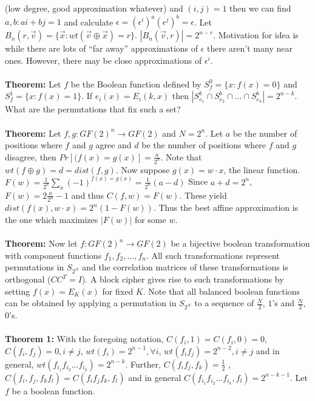 (low degree, good approximation whatever)
and $(i,j)=1$ then we can find $a, b: ai+bj=1$ and calculate
$\epsilon= (\epsilon^i)^a (\epsilon^j)^b= \epsilon$.  Let $B_n(r,{\vec v})=
\{ {\vec x} :  wt({\vec v} \oplus {\vec x}) =r \}$. $|B_n({\vec v}, r)|= 2^{n-r}$.  
Motivation for idea is while
there are lots of ``far away'' approximations of $\epsilon$ there aren't many near ones.  
However,
there may be close approximations of $\epsilon^i$.
\\
\\
{\bf Theorem:}
Let $f$ be the Boolean function defined by
$S^0_f= \{x: f(x)=0 \}$ and
$S^1_f= \{x: f(x)=1 \}$.  
If $e_i(x)= E_i(k,x)$ then 
$| S^{b}_{e_1} \cap S^{b}_{e_2} \cap \ldots \cap S^{b}_{e_k} |=2^{n-k}$.  What
are the permutations that fix such a set?
\\
\\
{\bf Theorem:}
Let $f,g: GF(2)^n \rightarrow GF(2)$ and $N= 2^n$.
Let $a$ be the number of positions where $f$ and $g$ agree and
$d$ be the number of positions where $f$ and $g$ disagree, then
$Pr[(f(x)=g(x)] = {\frac a {2^n}}$.
Note that
$wt(f \oplus g)=d= dist(f,g)$.  
Now suppose $g(x)= w \cdot x$,
the linear function.  $F(w)= {\frac 1 {2^n}} \sum_x (-1)^{f(x)=g(x)}= {\frac 1 {2^n}} (a-d)$
Since $a+d=2^n$, $F(w)= 2 {\frac a {2^n}} -1$ and thus $C(f,w)= F(w)$.  These yield
$dist(f(x),w \cdot x)= 2^n(1-F(w))$.  Thus the best affine approximation is the one which
maximizes $|F(w)|$ for some $w$.
\\
\\
{\bf Theorem:}
Now let $f: GF(2)^n \rightarrow GF(2)$ be a bijective boolean transformation with component
functions $f_1 , f_2 , \ldots , f_n$.  All such transformations represent
permutations in $S_{2^N}$ and the correlation matrices of these transformations is orthogonal
($C C^T = I$).  A block cipher gives rise to such transformations by setting $f(x)= E_K(x)$ for
fixed $K$.  Note that all balanced boolean functions can be obtained by applying a
permutation in $S_{2^N}$ to a sequence of ${\frac N 2}$, $1$'s and ${\frac N 2}$, $0$'s.
\\
\\
{\bf Theorem 1:} 
With the foregoing notation,
$C(f_i,1)= C(f_i,0)=0$, $C(f_i, f_j)=0, i \ne j$,
$wt(f_i)= 2^{n-1}, \forall i$, $wt(f_i f_j) = 2^{n-2}, i \ne j$ and in general,
$wt( f_{i_1} f_{i_2} \ldots f_{i_k})= 2^{n-k}$.  Further, $C(f_i f_j, f_k)= {\frac 1 2}$ ,
$C(f_i, f_j, f_k f_l) = C(f_i f_j f_k, f_l)$ and
in general
$C( f_{i_1} f_{i_2} \ldots f_{i_k}, f_l)= 2^{n-k-1}$. Let $f$ be a boolean function.

